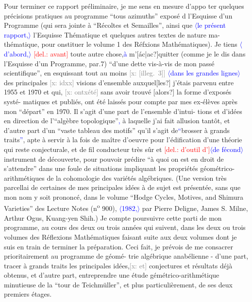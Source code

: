 \documentclass[11pt]{article}
\newcommand{\scanpage}[1]{\par\bigskip\noindent{\small\sffamily[scan #1]}\par}
\newcommand{\hand}[1]{\textcolor{blue}{#1}}
\let\over\relax
\newcommand{\over}[2]{\textcolor{gray}{#1}\textcolor{blue}{\ensuremath{^{\!\nearrow}}#2}}
\newcommand{\inserted}[2][]{\textcolor{blue}{$\langle$#2$\rangle$}}
\newcommand{\deleted}[1]{\textcolor{red}{[\textsf{del.:} #1]}}
\newcommand{\xout}[1]{\textcolor{gray}{[\textsf{x:} #1]}}
\newcommand{\unsure}[1]{[#1?]}
\newcommand{\illegible}[1]{[\textsf{illeg.\ #1}]}
\begin{document}
\clearpage
\scanpage{119/139}
Pour terminer ce rapport préliminaire,  je me sens en mesure d'appo
ter quelques précisions pratiques au programme ``tous azimuths'' exposé
d\over{\unsure{ans}}{ans} l'Esquisse d'un Programme (qui sera jointe à ``Récoltes et Semailles'',
ainsi que \inserted[typed]{le présent rapport,} l'Esquisse Thématique et quelques autres textes de nature ma-%
thématique,  pour \over{\unsure{c}}{c}onstituer le volume 1 des Réf\over{\unsure{le}}{le}xions Mathématiques).
Je tiens \inserted[typed]{d'abord,} \deleted{avant} toute autre chose,\hand{à} m'\unsure{ác|ac}quitter (comme je le dis dans
l'Esquisse d'un Programme, par.7) ``d'une dette vis-à-vis de mon passé
scientifique'',  en esquissant tout au moins \xout{\illegible{3}} \inserted[typed]{dans les grandes lignes} des
principales \xout{idxx} visions d'ensemble auxquel\unsure{les} j'étais parvenu entre 1955
et 1970 et qui, \xout{ontxété} sans avoir trouvé \unsure{alors} la forme d'exposés systé-%
matiques et publiés,  ont été laissés pour compte par mes ex-élèves
après mon ``départ'' en 1970.  Il s'agit d'une part de l'ensemble d'intui-%
tions et d'idées en direction de l'``algèbre topologique''\hand{,} à laquelle j'ai
fait allusion tantôt,  et d'autre part  d'un ``vaste tableau des motifs''
qu'il s'agit de\hand{``}brosser à grands traits\hand{''},  apte à servir à la fois de
maître d'oeuvre pour l'édification d'une théorie qui reste conjecturale,
et de fil conducteur très sûr et \deleted{d'outil d'}\inserted{de fécond} instrument de découverte,
pour pouvoir prédire ``à quoi on est en droit de s'attendre'' dans une
foule de situations impliquant les propriétés géométrico-arithmétiques
de la cohomologie des variétés algébriques. (Une version très parcellai
de certaines de mes principales idées à de sujet est présentée,  sans
que mon nom y soit prononcé,  dans le volume ``Hodge Cycles, Motives, and
Shimura Varieties'' des Lecture Notes (n\textsuperscript{o} 900), \inserted[typed]{1982,} par Pierre Deligne, James
S. Milne, Arthur Ogus, Kuang-yen Shih.) Je compte poursuivre cette parti
de mon programme, au cours des deux ou trois années qui suivent,  dans
les deux ou trois volumes des Réflexions Mathématiques faisant suite aux
deux volumes dont je suis en train de terminer la préparation.  Ceci
fait,  je prévois de me consacrer prioritairement au programme de géomé-%
trie algébrique anabélienne -  d'une part,  tracer à grands traits les
principales idées,\xout{et} conjectures et résultats déjà obtenus,  et d'autre
part,  entreprendre une étude gémétrico-arithmétique minutieuse de la
``tour de Teichmüller'',  et plus particulièrement,  de ses deux premiers
étages.
\end{document}
